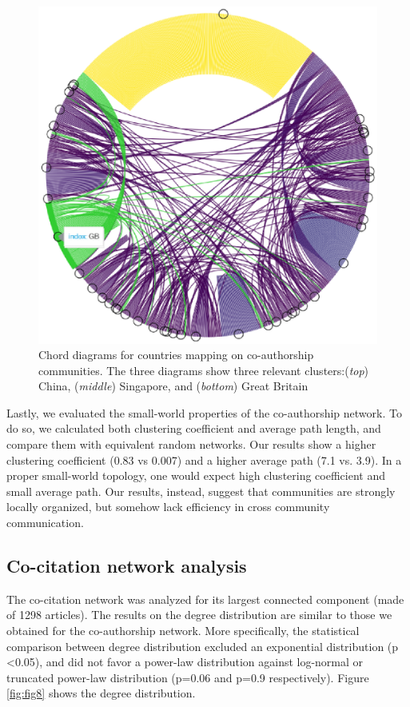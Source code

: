\documentclass[a4paper, review, endfloat, authoryear]{elsarticle}
\begin{document}
\begin{figure}[htbp]
		\includegraphics[height=0.3\textheight, keepaspectratio]{pics/coauthorship_country_chord_3.eps}
		\caption{Chord diagrams for countries mapping on co-authorship communities. The three diagrams show three relevant clusters:(\textit{top}) China, (\textit{middle}) Singapore, and (\textit{bottom}) Great Britain}\label{fig:fig7}
	\end{figure}
	
	Lastly, we evaluated the small-world properties of the co-authorship network. To do so, we calculated both clustering coefficient and average path length, and compare them with equivalent random networks. Our results show a higher clustering coefficient (0.83 vs 0.007) and a higher average path (7.1 vs. 3.9). In a proper small-world topology, one would expect high clustering coefficient and small average path. Our results, instead, suggest that communities are strongly locally organized, but somehow lack efficiency in cross community communication.
	
	\subsection{Co-citation network analysis}
	The co-citation network was analyzed for its largest connected component (made of 1298 articles). The results on the degree distribution are similar to those we obtained for the co-authorship network. More specifically, the statistical comparison between degree distribution excluded an exponential distribution (p \textless 0.05), and did not favor a power-law distribution against log-normal or truncated power-law distribution (p=0.06 and p=0.9 respectively). Figure \ref{fig:fig8} shows the degree distribution.
	
\end{document}
